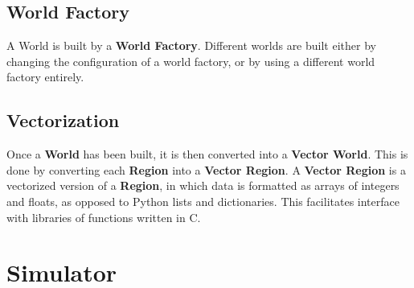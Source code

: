 \documentclass[10pt,letterpaper]{article}
\begin{document}
\subsection{World Factory}
A World is built by a \textbf{World Factory}. Different worlds are built either by changing the configuration of a world factory, or by using a different world factory entirely.

\subsection{Vectorization}
Once a \textbf{World} has been built, it is then converted into a \textbf{Vector World}. This is done by converting each \textbf{Region} into a \textbf{Vector Region}. A \textbf{Vector Region} is a vectorized version of a \textbf{Region}, in which data is formatted as arrays of integers and floats, as opposed to Python lists and dictionaries. This facilitates interface with libraries of functions written in C.

\section{Simulator}
\end{document}
